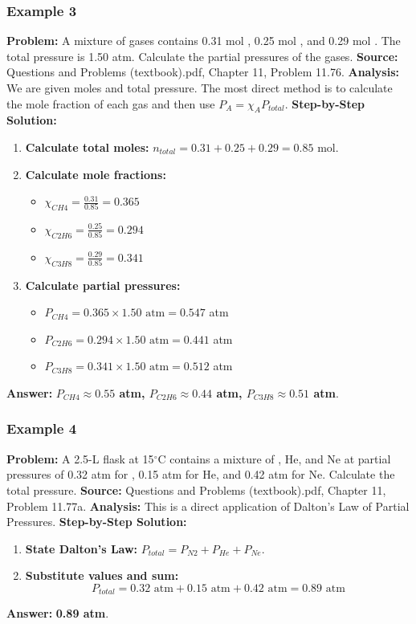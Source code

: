 \documentclass{article}
\begin{document}
\subsubsection{Example 3}
\textbf{Problem:} A mixture of gases contains 0.31 mol , 0.25 mol , and 0.29 mol . The total pressure is 1.50 atm. Calculate the partial pressures of the gases.
\textbf{Source:} Questions and Problems (textbook).pdf, Chapter 11, Problem 11.76.
\textbf{Analysis:} We are given moles and total pressure. The most direct method is to calculate the mole fraction of each gas and then use $P_A = \chi_A P_{total}$.
\textbf{Step-by-Step Solution:}
\begin{enumerate}
    \item \textbf{Calculate total moles:} $n_{total} = 0.31 + 0.25 + 0.29 = 0.85$ mol.
    \item \textbf{Calculate mole fractions:}
    \begin{itemize}
        \item $\chi_{CH4} = \frac{0.31}{0.85} = 0.365$
        \item $\chi_{C2H6} = \frac{0.25}{0.85} = 0.294$
        \item $\chi_{C3H8} = \frac{0.29}{0.85} = 0.341$
    \end{itemize}
    \item \textbf{Calculate partial pressures:}
    \begin{itemize}
        \item $P_{CH4} = 0.365 \times 1.50 \text{ atm} = 0.547$ atm
        \item $P_{C2H6} = 0.294 \times 1.50 \text{ atm} = 0.441$ atm
        \item $P_{C3H8} = 0.341 \times 1.50 \text{ atm} = 0.512$ atm
    \end{itemize}
\end{enumerate}
\textbf{Answer:} \textbf{$P_{CH4} \approx 0.55$ atm, $P_{C2H6} \approx 0.44$ atm, $P_{C3H8} \approx 0.51$ atm}.

\subsubsection{Example 4}
\textbf{Problem:} A 2.5-L flask at 15$^\circ$C contains a mixture of , He, and Ne at partial pressures of 0.32 atm for , 0.15 atm for He, and 0.42 atm for Ne. Calculate the total pressure.
\textbf{Source:} Questions and Problems (textbook).pdf, Chapter 11, Problem 11.77a.
\textbf{Analysis:} This is a direct application of Dalton's Law of Partial Pressures.
\textbf{Step-by-Step Solution:}
\begin{enumerate}
    \item \textbf{State Dalton's Law:} $P_{total} = P_{N2} + P_{He} + P_{Ne}$.
    \item \textbf{Substitute values and sum:}
    \[ P_{total} = 0.32 \text{ atm} + 0.15 \text{ atm} + 0.42 \text{ atm} = 0.89 \text{ atm} \]
\end{enumerate}
\textbf{Answer:} \textbf{0.89 atm}.
\end{document}

